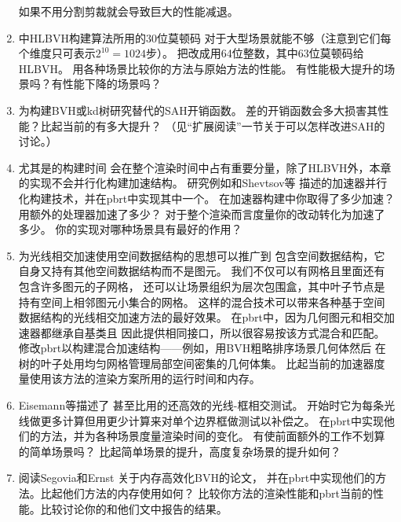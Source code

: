 \begin{enumerate}
          如果不用分割剪裁就会导致巨大的性能减退。
    \item \circletwo {}中HLBVH构建算法所用的30位莫顿码
          对于大型场景就能不够（注意到它们每个维度只可表示$2^{10}=1024$步）。
          把改成用64位整数，其中63位莫顿码给HLBVH。
          用各种场景比较你的方法与原始方法的性能。
          有性能极大提升的场景吗？有性能下降的场景吗？
    \item \circletwo 为构建BVH或kd树研究替代的SAH开销函数。
          差的开销函数会多大损害其性能？比起当前的有多大提升？
          （见“扩展阅读”一节关于可以怎样改进SAH的讨论。）
    \item \circlethree {}尤其是的构建时间
          会在整个渲染时间中占有重要分量，除了HLBVH外，本章的实现不会并行化构建加速结构。
          研究例如\citet{4342588}和Shevtsov等\parencite*{10.1111/j.1467-8659.2007.01062.x}
          描述的加速器并行化构建技术，并在pbrt中实现其中一个。
          在加速器构建中你取得了多少加速？用额外的处理器加速了多少？
          对于整个渲染而言度量你的改动转化为加速了多少。
          你的实现对哪种场景具有最好的作用？
    \item \circlethree 为光线相交加速使用空间数据结构的思想可以推广到
          包含空间数据结构，它自身又持有其他空间数据结构而不是图元。
          我们不仅可以有网格且里面还有包含许多图元的子网格，
          还可以让场景组织为层次包围盒，其中叶子节点是持有空间上相邻图元小集合的网格。
          这样的混合技术可以带来各种基于空间数据结构的光线相交加速方法的最好效果。
          在pbrt中，因为几何图元和相交加速器都继承自基类且
          因此提供相同接口，所以很容易按该方式混合和匹配。
          修改pbrt以构建混合加速结构——例如，用BVH粗略排序场景几何体然后
          在树的叶子处用均匀网格管理局部空间密集的几何体集。
          比起当前的加速器度量使用该方法的渲染方案所用的运行时间和内存。
    \item \circletwo Eisemann等\parencite*{10.1080/2151237X.2007.10129248}描述了
          甚至比用的还高效的光线-框相交测试。
          开始时它为每条光线做更多计算但用更少计算来对单个边界框做测试以补偿之。
          在pbrt中实现他们的方法，并为各种场景度量渲染时间的变化。
          有使前面额外的工作不划算的简单场景吗？
          比起简单场景的提升，高度复杂场景的提升如何？
    \item \circletwo 阅读Segovia和Ernst \parencite*{10.5555/1839214.1839242}关于内存高效化BVH的论文，
          并在pbrt中实现他们的方法。比起他们方法的内存使用如何？
          比较你方法的渲染性能和pbrt当前的性能。比较讨论你的和他们文中报告的结果。

\end{enumerate}
